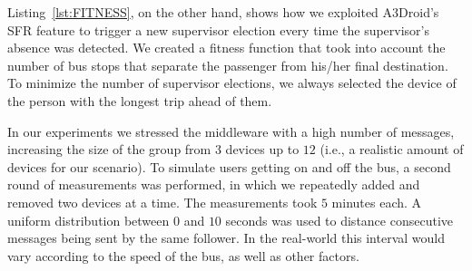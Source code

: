 

Listing~\ref{lst:FITNESS}, on the other hand, shows how we exploited A3Droid's SFR feature to trigger a new supervisor election every time the supervisor's absence was detected. We created a fitness function that took into account the number of bus stops that separate the passenger from his/her final destination. To minimize the number of supervisor elections, we always selected the device of the person with the longest trip ahead of them. 



In our experiments we stressed the middleware with a high number of messages, increasing the size of the group from $3$ devices up to $12$ (i.e., a realistic amount of devices for our scenario). To simulate users getting on and off the bus, a second round of measurements was performed, in which we repeatedly added and removed two devices at a time. The measurements took $5$ minutes each. A uniform distribution between $0$ and $10$ seconds was used to distance consecutive messages being sent by the same follower. In the real-world this interval would vary according to the speed of the bus, as well as other factors.

